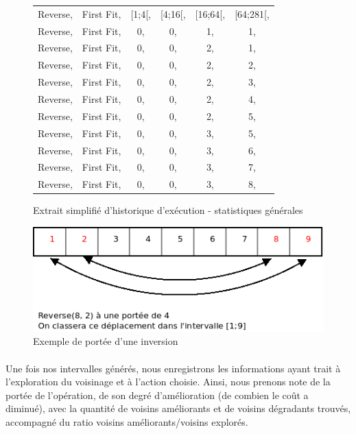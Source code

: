 \documentclass[a4paper,10pt]{report}
\begin{document}
\begin{figure}[h]
  \begin{center}
    \begin{tabular}{cccccc}
      Reverse,&First Fit,&[1;4[,&[4;16[,&[16;64[,&[64;281[,\\
      Reverse,&First Fit,&0,    &0,     &1,      &1,\\
      Reverse,&First Fit,&0,    &0,     &2,      &1,\\
      Reverse,&First Fit,&0,    &0,     &2,      &2,\\
      Reverse,&First Fit,&0,    &0,     &2,      &3,\\
      Reverse,&First Fit,&0,    &0,     &2,      &4,\\
      Reverse,&First Fit,&0,    &0,     &2,      &5,\\
      Reverse,&First Fit,&0,    &0,     &3,      &5,\\
      Reverse,&First Fit,&0,    &0,     &3,      &6,\\
      Reverse,&First Fit,&0,    &0,     &3,      &7,\\
      Reverse,&First Fit,&0,    &0,     &3,      &8,\\
    \end{tabular}
  \end{center}
  \label{a280-sample-interval-simple}
  \caption{Extrait simplifié d'historique d'exécution - statistiques générales}
\end{figure}


\begin{figure}[h]
  \begin{center}
    \includegraphics[width=\textwidth]{images/reverse-range.png}
  \end{center}
  \caption{Exemple de portée d'une inversion}
\end{figure}


\paragraph{}
  Une fois nos intervalles générés, nous enregistrons les informations ayant
trait à l'exploration du voisinage et à l'action choisie. Ainsi, nous prenons
note de la portée de l'opération, de son degré d'amélioration (de combien le
coût a diminué), avec la quantité de voisins améliorants et de voisins
dégradants trouvés, accompagné du ratio voisins améliorants/voisins explorés.
\end{document}
